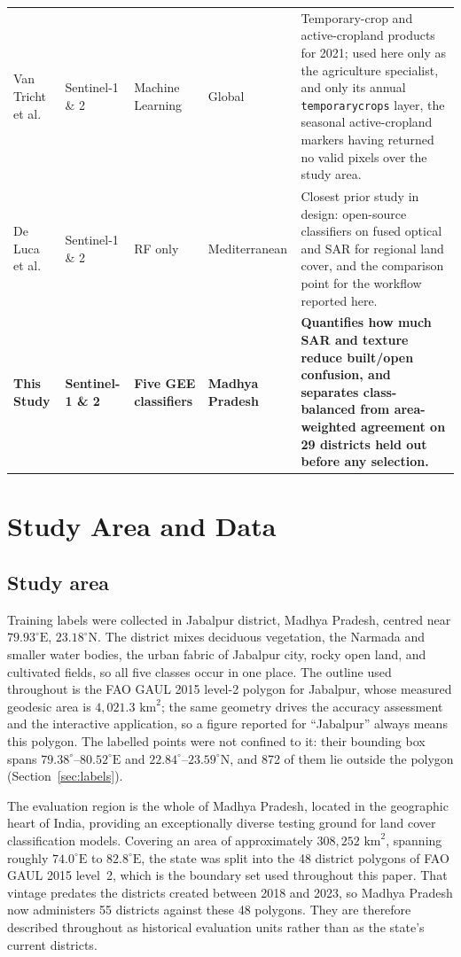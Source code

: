 \documentclass[conference]{IEEEtran}
\begin{document}
\begin{table}[!t]
\begin{center}
\begin{tabular}{p{2.5cm}p{2.5cm}p{3cm}p{3cm}p{5cm}}
Van Tricht et al. \cite{r16}& Sentinel-1 \& 2 & Machine Learning & Global & Temporary-crop and active-cropland products for 2021; used here only as the agriculture specialist, and only its annual \texttt{temporarycrops} layer, the seasonal active-cropland markers having returned no valid pixels over the study area. \\
De Luca et al. \cite{r33} & Sentinel-1 \& 2 & RF only & Mediterranean & Closest prior study in design: open-source classifiers on fused optical and SAR for regional land cover, and the comparison point for the workflow reported here. \\
\textbf{This Study} & \textbf{Sentinel-1 \& 2} & \textbf{Five GEE classifiers} & \textbf{Madhya Pradesh} & \textbf{Quantifies how much SAR and texture reduce built/open confusion, and separates class-balanced from area-weighted agreement on 29 districts held out before any selection.} \\
\bottomrule
\end{tabular}
\end{center}
\end{table}

\section{Study Area and Data}

\subsection{Study area}
Training labels were collected in Jabalpur district, Madhya Pradesh, centred near $79.93^\circ\text{E}$, $23.18^\circ\text{N}$. The district mixes deciduous vegetation, the Narmada and smaller water bodies, the urban fabric of Jabalpur city, rocky open land, and cultivated fields, so all five classes occur in one place. The outline used throughout is the FAO GAUL 2015 level-2 polygon for Jabalpur, whose measured geodesic area is $4{,}021.3\text{ km}^2$; the same geometry drives the accuracy assessment and the interactive application, so a figure reported for ``Jabalpur'' always means this polygon. The labelled points were not confined to it: their bounding box spans $79.38^\circ$--$80.52^\circ\text{E}$ and $22.84^\circ$--$23.59^\circ\text{N}$, and 872 of them lie outside the polygon (Section~\ref{sec:labels}).

The evaluation region is the whole of Madhya Pradesh, located in the geographic heart of India, providing an exceptionally diverse testing ground for land cover classification models. Covering an area of approximately $308,252\text{ km}^2$, spanning roughly $74.0^\circ\text{E}$ to $82.8^\circ\text{E}$, the state was split into the 48 district polygons of FAO GAUL 2015 level~2, which is the boundary set used throughout this paper. That vintage predates the districts created between 2018 and 2023, so Madhya Pradesh now administers 55 districts against these 48 polygons. They are therefore described throughout as historical evaluation units rather than as the state's current districts. 
\end{document}
